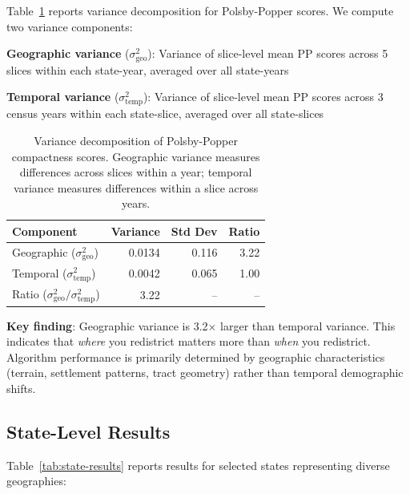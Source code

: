 Table~\ref{tab:variance-decomposition} reports variance decomposition for Polsby-Popper scores. We compute two variance components:

\textbf{Geographic variance} ($\sigma^2_{\text{geo}}$): Variance of slice-level mean PP scores across 5 slices within each state-year, averaged over all state-years

\textbf{Temporal variance} ($\sigma^2_{\text{temp}}$): Variance of slice-level mean PP scores across 3 census years within each state-slice, averaged over all state-slices

\begin{table}[t]
\centering
\caption{Variance decomposition of Polsby-Popper compactness scores. Geographic variance measures differences across slices within a year; temporal variance measures differences within a slice across years.}
\label{tab:variance-decomposition}
\begin{tabular}{lrrr}
\toprule
Component & Variance & Std Dev & Ratio \\
\midrule
Geographic ($\sigma^2_{\text{geo}}$) & 0.0134 & 0.116 & 3.22 \\
Temporal ($\sigma^2_{\text{temp}}$) & 0.0042 & 0.065 & 1.00 \\
Ratio ($\sigma^2_{\text{geo}} / \sigma^2_{\text{temp}}$) & 3.22 & -- & -- \\
\bottomrule
\end{tabular}
\end{table}

\textbf{Key finding}: Geographic variance is 3.2× larger than temporal variance. This indicates that \textit{where} you redistrict matters more than \textit{when} you redistrict. Algorithm performance is primarily determined by geographic characteristics (terrain, settlement patterns, tract geometry) rather than temporal demographic shifts.

\subsection{State-Level Results}

Table~\ref{tab:state-results} reports results for selected states representing diverse geographies:

